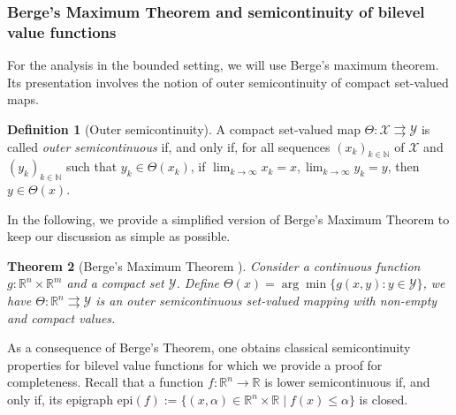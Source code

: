 \documentclass{article}
\newcommand*{\cP}{\mathcal{P}}
\newcommand*{\cX}{\mathcal{X}}
\newcommand*{\cY}{\mathcal{Y}}
\newcommand*{\RR}{\mathbb{R}}
\newcommand*{\NN}{\mathbb{N}}
\newcommand{\argmin}{\arg\min}
\newcommand{\firstvar}{x}
\newcommand{\secondvar}{y}
\newcommand{\bounded}{\text{bounded}}
\newcommand{\optim}{\text{optim}}
\newcommand{\pessim}{\text{pessim}}
\newcommand{\valoptim}{\varphi_o}
\newcommand{\valpessim}{\varphi_p}
\theoremstyle{plain}
\newtheorem{theorem}{Theorem}[section]
\newtheorem{corollary}[theorem]{Corollary}
\theoremstyle{definition}
\newtheorem{definition}[theorem]{Definition}
\begin{document}
\subsubsection*{Berge's Maximum Theorem and semicontinuity of bilevel value functions} 
For the analysis in the bounded setting, we will use Berge's maximum theorem. Its presentation involves the notion of outer semicontinuity of compact set-valued maps.

\begin{definition}[Outer semicontinuity]
    A compact set-valued map $\Theta: \cX \rightrightarrows \cY$ is called \emph{outer semicontinuous} if, and only if, for all sequences $(\firstvar_k)_{k \in \NN}$ of $\cX$ and $(\secondvar_k)_{k \in \NN}$ such that $\secondvar_k \in \Theta(\firstvar_k)$, if $\lim_{k \to \infty} \firstvar_k = \firstvar, \lim_{k \to \infty} \secondvar_k = \secondvar$, then $\secondvar \in \Theta(\firstvar)$.
\end{definition}

In the following, we provide a simplified version of Berge's Maximum Theorem to keep our discussion as simple as possible. 
\begin{theorem}[Berge's Maximum Theorem {\cite[Section 6.3]{maximum_theorem}}]
    \label{theorem:maximum_theorem}
    Consider a continuous function $g: \RR^n \times \RR^m$ and a compact set $\cY$. Define $\Theta(\firstvar)=\argmin\{g(\firstvar,\secondvar): \secondvar \in \cY\}$, we have $\Theta: \RR^n \rightrightarrows \cY$ is an outer semicontinuous set-valued mapping with non-empty and compact values.
\end{theorem}

As a consequence of Berge's Theorem, one obtains classical semicontinuity properties for bilevel value functions for which we provide a proof for completeness. Recall that a function $f: \RR^n \to \RR$ is lower semicontinuous if, and only if, its epigraph $\text{epi}(f):=\{(x, \alpha) \in \RR^n \times \RR \mid f(x) \leq \alpha\}$ is closed. %
\end{document}
